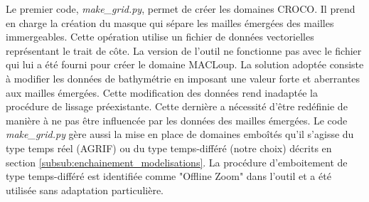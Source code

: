 \documentclass[10pt,a4paper,titlepage]{article}
\begin{document}
    Le premier code, \textit{make\_grid.py}, permet de créer les domaines CROCO.
    Il prend en charge la création du masque qui sépare les mailles émergées des mailles immergeables.
    Cette opération utilise un fichier de données vectorielles représentant le trait de côte.
    La version de l'outil ne fonctionne pas avec le fichier qui lui a été fourni pour créer le domaine MACLoup.
    La solution adoptée consiste à modifier les données de bathymétrie en imposant une valeur forte et aberrantes  aux mailles émergées.
    Cette modification des données rend inadaptée la procédure de lissage préexistante.
    Cette dernière a nécessité d'être redéfinie de manière à ne pas être influencée par les données des mailles émergées.
    Le code \textit{make\_grid.py} gère aussi la mise en place de domaines emboîtés qu'il s'agisse du type temps réel (AGRIF) ou du type temps-différé (notre choix) décrits en section \ref{subsub:enchainement_modelisations}.
    La procédure d'emboitement de type temps-différé est identifiée comme "Offline Zoom" dans l'outil
    et a été utilisée sans adaptation particulière.
    
\end{document}
